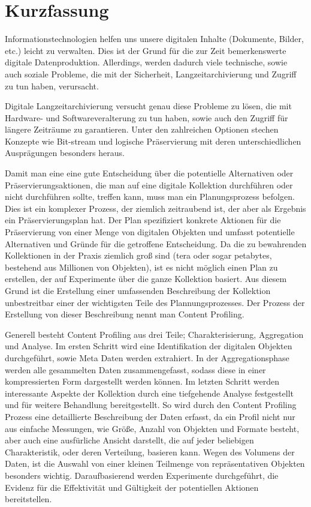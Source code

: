 \chapter*{Kurzfassung}
\vspace{-1cm}
Informationstechnologien helfen uns unsere digitalen Inhalte (Dokumente, Bilder, etc.) leicht zu verwalten.
Dies ist der Grund f\"{u}r die zur Zeit bemerkenswerte digitale Datenproduktion.
Allerdings, werden dadurch viele technische, sowie auch soziale Probleme, die mit der Sicherheit, Langzeitarchivierung und Zugriff zu tun haben, verursacht.

Digitale Langzeitarchivierung versucht genau diese Probleme zu l\"{o}sen, die mit Hardware- und Softwareveralterung zu tun haben, sowie auch den Zugriff f\"{u}r l\"{a}ngere Zeitr\"{a}ume zu garantieren.
Unter den zahlreichen Optionen stechen Konzepte wie Bit-stream und logische Pr\"{a}servierung mit deren unterschiedlichen Auspr\"{a}gungen besonders heraus.

Damit man eine eine gute Entscheidung \"{u}ber die potentielle Alternativen oder Pr\"{a}servierungsaktionen, die man auf eine digitale Kollektion durchf\"{u}hren oder nicht durchf\"{u}hren sollte, treffen kann, muss man ein Planungsprozess befolgen.
Dies ist ein komplexer Prozess, der ziemlich zeitraubend ist, der aber als Ergebnis ein Pr\"{a}servierungsplan hat.
Der Plan spezifiziert konkrete Aktionen f\"{u}r die Pr\"{a}servierung von einer Menge von digitalen Objekten und umfasst potentielle Alternativen und Gr\"{u}nde f\"{u}r die getroffene Entscheidung.
Da die zu bewahrenden Kollektionen in der Praxis ziemlich gro{\ss} sind (tera oder sogar petabytes, bestehend aus Millionen von Objekten), ist es nicht m\"{o}glich einen Plan zu erstellen, der auf Experimente \"{u}ber die ganze Kollektion basiert.
Aus diesem Grund ist die Erstellung einer umfassenden Beschreibung der Kollektion unbestreitbar einer der wichtigsten Teile des Plannungsprozesses.
Der Prozess der Erstellung von dieser Beschreibung nennt man Content Profiling.

Generell besteht Content Profiling aus drei Teile; Charakterisierung, Aggregation und Analyse.
Im ersten Schritt wird eine Identifikation der digitalen Objekten durchgef\"{u}hrt, sowie Meta Daten werden extrahiert.
In der Aggregationsphase werden alle gesammelten Daten zusammengefasst, sodass diese in einer kompressierten Form dargestellt werden k\"{o}nnen.
Im letzten Schritt werden interessante Aspekte der Kollektion durch eine tiefgehende Analyse festgestellt und f\"{u}r weitere Behandlung bereitgestellt. 
So wird durch den Content Profiling Prozess eine detaillierte Beschreibung der Daten erfasst, da ein Profil nicht nur aus einfache Messungen, wie Gr\"{o}{\ss}e, Anzahl von Objekten und Formate besteht, aber auch eine ausf\"{u}rliche Ansicht darstellt, die auf jeder beliebigen Charakteristik, oder deren Verteilung, basieren kann.
Wegen des Volumens der Daten, ist die Auswahl von einer kleinen Teilmenge von repr\"{a}sentativen Objekten besonders wichtig.
Daraufbasierend werden Experimente durchgef\"{u}hrt, die Evidenz f\"{u}r die Effektivit\"{a}t und G\"{u}ltigkeit der potentiellen Aktionen bereitstellen.

